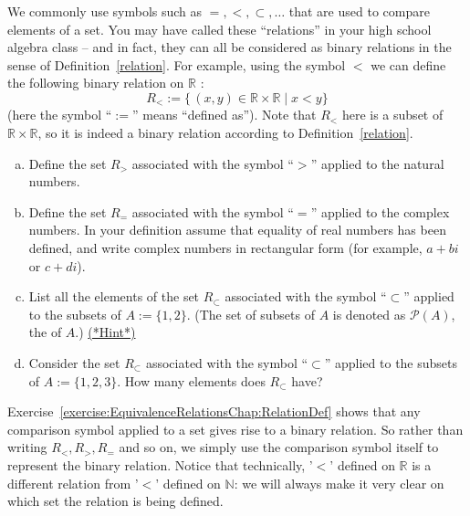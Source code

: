 We commonly use symbols  such as $=, < , \subset, \ldots $  that are used to compare elements of a set. You may have called these ``relations'' in your high school algebra class -- and in fact, they can all be considered as binary relations in the sense of Definition~\ref{relation}.
For example, using the symbol $<$ we can define the following binary relation on ${\mathbb R}$ :
\[ R_<  := \{\, (x,y) \in \mathbb{R} \times \mathbb{R} \mid x < y \}  \]
(here the symbol ``$:=$'' means ``defined as'').  Note that $ R_<$ here is a subset of $\mathbb{R} \times \mathbb{R}$, so it is indeed a binary relation according to Definition~\ref{relation}. 


\begin{exer}\label{exercise:EquivalenceRelationsChap:RelationDef}
\begin{enumerate}[(a)]
 \item  
 Define the set $R_>$ associated with the symbol ``$>$'' applied to the natural numbers.
 \item  
 Define the set $R_=$ associated with the symbol ``$=$'' applied to the complex numbers. In your definition assume that equality of real numbers has been defined, and write complex numbers in rectangular form (for example, $a + bi$ or $c + di$).
 \item  
 List all the elements of the set $R_\subset$ associated with the symbol ``$\subset$'' applied to the subsets of $A := \{1,2\}$. (The set of subsets of $A$ is denoted as $\mathcal{P}(A)$, the  of $A$.)
 \hyperref[secEqRelChapHints]{(*Hint*)}
 \item  
Consider the set $R_\subset$ associated with the symbol ``$\subset$'' applied to the subsets of $A := \{1,2,3\}$. How many elements does $R_\subset$ have?
 \end{enumerate}
 \end{exer}
 
Exercise~\ref{exercise:EquivalenceRelationsChap:RelationDef} shows that any comparison symbol applied to a set gives rise to a binary relation. So rather than writing $R_<, R_>, R_=$ and so on, we simply use the comparison symbol itself to represent the binary relation.  Notice that technically, '$<$' defined on $\mathbb{R}$ is a different relation from '$<$' defined on $\mathbb{N}$: we will always make it very clear on which set the relation is being defined.

